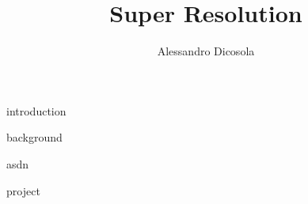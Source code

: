\documentclass{article}
\author{Alessandro Dicosola}
\title{Super Resolution}
\begin{document}
\maketitle
\tableofcontents

{introduction}

\clearpage
{background}

\clearpage
{asdn}

\clearpage
{project}

\clearpage


\end{document}
